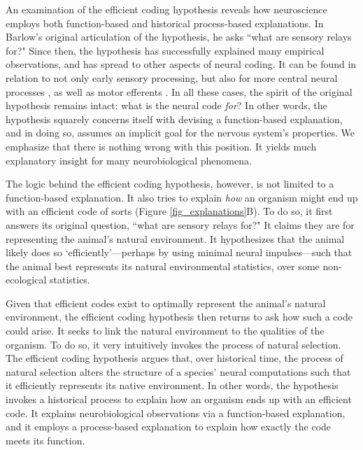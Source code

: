 \documentclass[twocolumn]{article}
\begin{document}
An examination of the efficient coding hypothesis reveals how neuroscience employs both function-based and historical process-based explanations. In Barlow's original articulation of the hypothesis, he asks ``what are sensory relays for?" \cite{Barlow_1961} Since then, the hypothesis has successfully explained many empirical observations, and has spread to other aspects of neural coding. It can be found in relation to not only early sensory processing, but also for more central neural processes \cite{olshausen_field_1996, Pitkow_Meister_2012, brunton_2013}, as well as motor efferents \cite{hoyt_taylor_1981, sparrow_newell_1998, Mimica_Dunn_Tombaz_Bojja_Whitlock_2018}. In all these cases, the spirit of the original hypothesis remains intact: what is the neural code \textit{for}? In other words, the hypothesis squarely concerns itself with devising a function-based explanation, and in doing so, assumes an implicit goal for the nervous system's properties. We emphasize that there is nothing wrong with this position. It yields much explanatory insight for many neurobiological phenomena. 

The logic behind the efficient coding hypothesis, however, is not limited to a function-based explanation. It also tries to explain \textit{how} an organism might end up with an efficient code of sorts (Figure \ref{fig_explanations}B). To do so, it first answers its original question, ``what are sensory relays for?" It claims they are for representing the animal's natural environment. It hypothesizes that the animal likely does so `efficiently'---perhaps by using minimal neural impulses---such that the animal best represents its natural environmental statistics, over some non-ecological statistics. 

Given that efficient codes exist to optimally represent the animal's natural environment, the efficient coding hypothesis then returns to ask how such a code could arise. It seeks to link the natural environment to the qualities of the organism. To do so, it very intuitively invokes the process of natural selection. The efficient coding hypothesis argues that, over historical time, the process of natural selection alters the structure of a species' neural computations such that it efficiently represents its native environment. In other words, the hypothesis invokes a historical process to explain how an organism ends up with an efficient code. It explains neurobiological observations via a function-based explanation, and it employs a process-based explanation to explain how exactly the code meets its function. 
\end{document}
